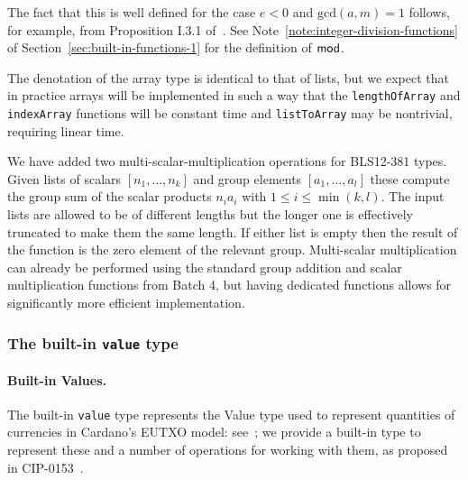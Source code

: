 \noindent The fact that this is well defined for the case $e<0$ and $\mathrm{gcd}(a,m) = 1$
follows, for example, from Proposition I.3.1 of~\cite{Koblitz-GTM}.  See
Note~\ref{note:integer-division-functions} of
Section~\ref{sec:built-in-functions-1} for the definition of $\operatorname{\mathsf{mod}}$.

\label{note:array-semantics}
The denotation of the array type is identical to that of lists, but we expect
that in practice arrays will be implemented in such a way that the
\texttt{lengthOfArray} and \texttt{indexArray} functions will be constant time and
\texttt{listToArray} may be nontrivial, requiring linear time.

\label{note:msm-semantics}
We have added two multi-scalar-multiplication operations for BLS12-381
types. Given lists of scalars $[n_1, \ldots, n_k]$ and group elements
$[a_1, \ldots, a_l]$ these compute the group sum of the scalar products $n_ia_i$
with $1 \leq i \leq \min(k,l)$. The input lists are allowed to be of different
lengths but the longer one is effectively truncated to make them the same
length.  If either list is empty then the result of the function is the zero
element of the relevant group.  Multi-scalar multiplication can already be
performed using the standard group addition and scalar multiplication functions
from Batch 4, but having dedicated functions allows for significantly more
efficient implementation.

\newcommand{\BB}{\mathtt{B}\;}
\newcommand{\II}{\mathtt{I}\;}
\newcommand{\flatten}[1]{\ensuremath{#1}\text{\textdownarrow}}
\newcommand{\unflatten}[1]{\ensuremath{#1}\text{\textuparrow}}

\subsubsection{The built-in \texttt{value} type}
\label{sec:built-in-value-type}

\paragraph{Built-in \textsf{Values}.}
The built-in \texttt{value} type represents the \textsf{Value} type used to
represent quantities of currencies in Cardano's EUTXO model: see~\cite{EUTXOma};
we provide a built-in type to represent these and a number of operations for
working with them, as proposed in CIP-0153~\cite{CIP-0153}.

